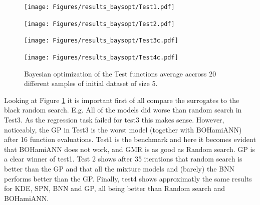 \begin{figure}[H]
  \centering
  \begin{minipage}[b]{0.49\textwidth}
   \texttt{[image: Figures/results\_baysopt/Test1.pdf]}
  \end{minipage}
  \hfill
  \begin{minipage}[b]{0.49\textwidth}
    \texttt{[image: Figures/results\_baysopt/Test2.pdf]}
   \end{minipage}
   \begin{minipage}[b]{0.49\textwidth}
    \texttt{[image: Figures/results\_baysopt/Test3c.pdf]}
   \end{minipage}
   \hfill
   \begin{minipage}[b]{0.49\textwidth}
     \texttt{[image: Figures/results\_baysopt/Test4c.pdf]}
    \end{minipage}
  \caption{Bayesian optimization of the Test functions average accross 20 different samples of initial dataset of size 5.}
  \label{Test_bayesOpt}
\end{figure}
Looking at Figure \ref{Test_bayesOpt} it is important first of all compare the surrogates to the black random search. E.g. 
All of the models did worse than random search in Test3. As the regression task failed for test3 this makes sense. However, 
noticeably, the GP in Test3 is the worst model (together with BOHamiANN) after 16 function evaluations. Test1 is the benchmark
and here it becomes evident that BOHamiANN does not work, and GMR is as good as Random search. GP is a clear winner of test1. 
Test 2 shows after 35 iterations that random search is better than the GP and that all the mixture models and (barely) the BNN 
performs better than the GP. Finally, test4 shows approximatly the same results for KDE, SPN, BNN and GP, all being better than Random 
search and BOHamiANN. 



